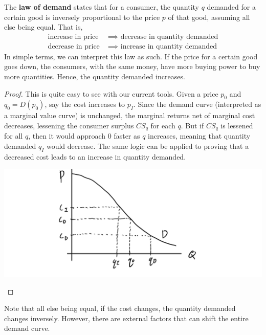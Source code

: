 \documentclass{article}
\begin{document}
    \begin{theorem}
      The \textbf{law of demand} states that for a consumer, the quantity $q$ demanded for a certain good is inversely proportional to the price $p$ of that good, assuming all else being equal. That is, 
      \begin{align*}
        \text{increase in price } & \implies \text{ decrease in quantity demanded} \\
        \text{decrease in price } & \implies \text{ increase in quantity demanded}
      \end{align*}
      In simple terms, we can interpret this law as such. If the price for a certain good goes down, the consumers, with the same money, have more buying power to buy more quantities. Hence, the quantity demanded increases. 
    \end{theorem}
    \begin{proof}
      This is quite easy to see with our current tools. Given a price $p_0$ and $q_0 = D (p_0)$, say the cost increases to $p_I$. Since the demand curve (interpreted as a marginal value curve) is unchanged, the marginal returns net of marginal cost decreases, lessening the consumer surplus $CS_q$ for each $q$. But if $CS_q$ is lessened for all $q$, then it would approach $0$ faster as $q$ increases, meaning that quantity demanded $q_I$ would decrease. The same logic can be applied to proving that a decreased cost leads to an increase in quantity demanded. 
      \begin{center}
        \includegraphics[scale=0.22]{img/Cost_vs_Quantity_Demand_Curve.PNG}
      \end{center}
    \end{proof}

    Note that all else being equal, if the cost changes, the quantity demanded changes inversely. However, there are external factors that can shift the entire demand curve. 
\end{document}

